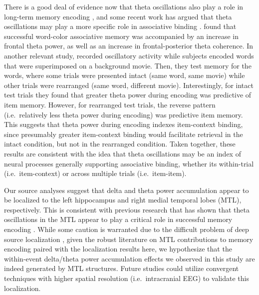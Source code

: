 There is a good deal of evidence now that theta oscillations also play a
role in long-term memory encoding
\autocites{guderian_medial_2009}{fell_medial_2011}{sederberg_theta_2003}{friese_successful_2013}{summerfield_coherent_2005}{staudigl_theta_2013}{white_theta_2013}{pastotter_distinct_2014}{osipova_theta_2006}{hanslmayr_relationship_2011},
and some recent work has argued that theta oscillations may play a more
specific role in associative binding
\autocites{hsieh_neural_2011}{summerfield_coherent_2005}{staudigl_theta_2013}.
\textcite{summerfield_coherent_2005} found that successful word-color
associative memory was accompanied by an increase in frontal theta
power, as well as an increase in frontal-posterior theta coherence. In
another relevant study, \textcite{staudigl_theta_2013} recorded
oscillatory activity while subjects encoded words that were superimposed
on a background movie. Then, they test memory for the words, where some
trials were presented intact (same word, same movie) while other trials
were rearranged (same word, different movie). Interestingly, for intact
test trials they found that greater theta power during encoding was
predictive of item memory. However, for rearranged test trials, the
reverse pattern (i.e.~relatively less theta power during encoding) was
predictive item memory. This suggests that theta power during encoding
indexes item-context binding, since presumably greater item-context
binding would facilitate retrieval in the intact condition, but not in
the rearranged condition. Taken together, these results are consistent
with the idea that theta oscillations may be an index of neural
processes generally supporting associative binding, whether its
within-trial (i.e.~item-context) or across multiple trials
(i.e.~item-item).

Our source analyses suggest that delta and theta power accumulation
appear to be localized to the left hippocampus and right medial temporal
lobes (MTL), respectively. This is consistent with previous research
that has shown that theta oscillations in the MTL appear to play a
critical role in successful memory encoding
\autocites{guderian_medial_2009}{fell_medial_2011}{sederberg_theta_2003}{friese_successful_2013}{summerfield_coherent_2005}{staudigl_theta_2013}{white_theta_2013}{pastotter_distinct_2014}{osipova_theta_2006}{hanslmayr_relationship_2011}.
While some caution is warranted due to the difficult problem of deep
source localization
\autocites{attal_assessment_2013}{mills_techniques_2012}{quraan_detection_2011},
given the robust literature on MTL contributions to memory encoding
paired with the localization results here, we hypothesize that the
within-event delta/theta power accumulation effects we observed in this
study are indeed generated by MTL structures. Future studies could
utilize convergent techniques with higher spatial resolution
(i.e.~intracranial EEG) to validate this localization.

